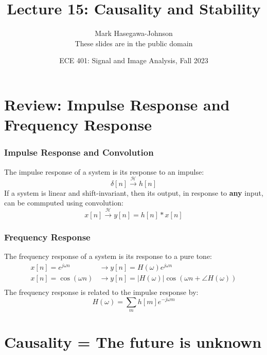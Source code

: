 \documentclass{beamer}
\title{Lecture 15: Causality and Stability}
\author{Mark Hasegawa-Johnson\\These slides are in the public domain}
\date{ECE 401: Signal and Image Analysis, Fall 2023}
\begin{document}
\begin{frame}
  \maketitle
\end{frame}

\begin{frame}
  \tableofcontents
\end{frame}

\section[Review]{Review: Impulse Response and Frequency Response}
\setcounter{subsection}{1}

\begin{frame}
  \frametitle{Impulse Response and Convolution}

  The impulse response of a system is its response to an impulse:
  \begin{displaymath}
    \delta[n] \stackrel{\mathcal H}{\longrightarrow} h[n]
  \end{displaymath}
  If a system is linear and shift-invariant, then its output, in
  response to {\bf any} input, can be commputed  using convolution:
  \begin{displaymath}
    x[n] \stackrel{\mathcal H}{\longrightarrow} y[n]=h[n]\ast x[n]
  \end{displaymath}
\end{frame}

\begin{frame}
  \frametitle{Frequency Response}

  The frequency response of a system is its response to a pure tone:
  \begin{align*}
    x[n]=e^{j\omega n} &\rightarrow y[n]=H(\omega)e^{j\omega n}\\
    x[n]=\cos\left(\omega n\right)
    &\rightarrow y[n]=|H(\omega)|\cos\left(\omega n+\angle H(\omega)\right)\\
  \end{align*}
  The frequency response is related to the impulse response by:
  \[
  H(\omega) = \sum_m h[m]e^{-j\omega m}
  \]
\end{frame}  
        

\section[Causality]{Causality = The future is unknown}
\setcounter{subsection}{1}
\end{document}
